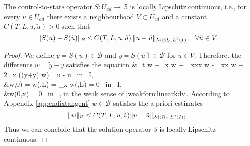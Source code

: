 \begin{lemma}
The control-to-state operator $S\colon U_{ad}\rightarrow \mathcal B$ is locally Lipschitz continuous, i.e., for every $u\in U_{ad}$ there exists a neighbourhood $V\subset U_{ad}$ and a constant
$C(T,L,u,\tilde u)>0$ such that
\[\|S(u)-S(\tilde u)\|_{\mathcal B}\leq C(T,L,u,\tilde u)\,\|u-\tilde u\|_{\mathcal{M}(\Omega_c, L^{2}(I))}\quad \forall \tilde u\in V.\]
 \label{lipschitzcontinuity}
\end{lemma}
\begin{proof}
We define $y = S(u) \in \mathcal{B}$ and $\tilde{y} = S(\tilde u) \in \mathcal{B}$ for $\tilde u\in V$. Therefore, the difference $w = \tilde{y} - y$ satisfies the equation
\bean
&\partial_t w +\partial_x w + \partial_{xxx} w - \gamma \partial_{xx} w  +  2\partial_x ((y+\tilde y) w)= \tilde u - u \mbox{ in } I\times\Omega,\\
&w\cdot,0) = w(\cdot,L) = \partial_x w(\cdot,L) = 0 \mbox{ in } I,\\
&w(0,x) = 0 \mbox{ in } \Omega,
\eean
in the weak sense of \eqref{weakformlinearkdv}. According to Appendix \ref{appendixtangent} $w \in \mathcal{B}$ satisfies the a priori estimates
\[
\lVert w\rVert_{\mathcal{B}} \leq C(T,L,u,\tilde u)\lVert u-\tilde u\rVert_{\mathcal{M}(\Omega_c, L^{2}(I))}.
\]
Thus we can conclude that the solution operator $S$ is locally Lipschitz continuous.
\qquad\end{proof}


